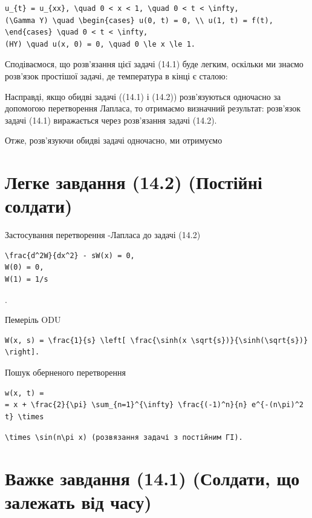 \documentclass[
  ukrainian,
]{article}
\begin{document}
\begin{verbatim}
u_{t} = u_{xx}, \quad 0 < x < 1, \quad 0 < t < \infty,
(\Gamma Y) \quad \begin{cases} u(0, t) = 0, \\ u(1, t) = f(t), \end{cases} \quad 0 < t < \infty,
(HY) \quad u(x, 0) = 0, \quad 0 \le x \le 1.
\end{verbatim}

Сподіваємося, що розв'язання цієї задачі (14.1) буде легким, оскільки ми
знаємо розв'язок простішої задачі, де температура в кінці є сталою:

Насправді, якщо обидві задачі ((14.1) і (14.2)) розв'язуються одночасно
за допомогою перетворення Лапласа, то отримаємо визначний результат:
розв'язок задачі (14.1) виражається через розв'язання задачі (14.2).

Отже, розв'язуючи обидві задачі одночасно, ми отримуємо

\section{Легке завдання (14.2) (Постійні
солдати)}\label{ux43bux435ux433ux43aux435-ux437ux430ux432ux434ux430ux43dux43dux44f-14.2-ux43fux43eux441ux442ux456ux439ux43dux456-ux441ux43eux43bux434ux430ux442ux438}

Застосування перетворення -Лапласа до задачі (14.2)

\begin{verbatim}
\frac{d^2W}{dx^2} - sW(x) = 0,
W(0) = 0,
W(1) = 1/s
\end{verbatim}

.

Пемеріль ODU

\begin{verbatim}
W(x, s) = \frac{1}{s} \left[ \frac{\sinh(x \sqrt{s})}{\sinh(\sqrt{s})} \right].
\end{verbatim}

Пошук оберненого перетворення

\begin{verbatim}
w(x, t) =
= x + \frac{2}{\pi} \sum_{n=1}^{\infty} \frac{(-1)^n}{n} e^{-(n\pi)^2 t} \times
\end{verbatim}

\texttt{\textquotesingle{}\textbackslash{}times\ \textbackslash{}sin(n\textbackslash{}pi\ x)\textquotesingle{}\ (розв\textquotesingle{}язання\ задачі\ з\ постійним\ ГІ).}

\section{Важке завдання (14.1) (Солдати, що залежать від
часу)}\label{ux432ux430ux436ux43aux435-ux437ux430ux432ux434ux430ux43dux43dux44f-14.1-ux441ux43eux43bux434ux430ux442ux438-ux449ux43e-ux437ux430ux43bux435ux436ux430ux442ux44c-ux432ux456ux434-ux447ux430ux441ux443}
\end{document}
